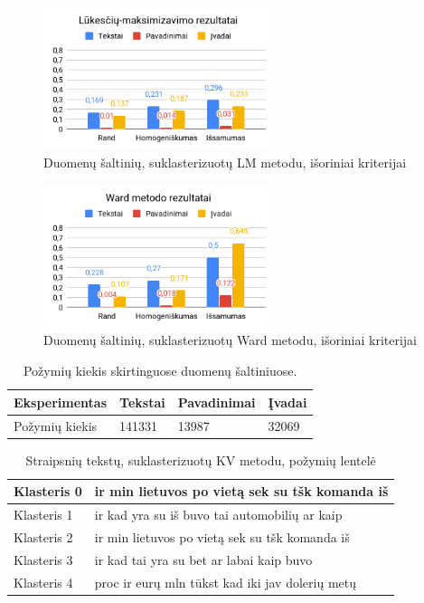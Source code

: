 \documentclass{VUMIFInfBakalaurinis}
\begin{document}
\begin{figure}[H]
	\centering
	\includegraphics[width=0.6\textwidth]{./img/image2.png}
  \caption{Duomenų šaltinių, suklasterizuotų LM metodu, išoriniai kriterijai}
\end{figure}

\begin{figure}[H]
	\centering
	\includegraphics[width=0.6\textwidth]{./img/image10.png}
  \caption{Duomenų šaltinių, suklasterizuotų Ward metodu, išoriniai kriterijai}
\end{figure}

\begin{table}[H]
  \centering
  \caption{Požymių kiekis skirtinguose duomenų šaltiniuose.}
  \begin{tabular}{|l|l|l|l|}
  \hline
  Eksperimentas & Tekstai & Pavadinimai & Įvadai \\ \hline
  Požymių kiekis        & 141331  & 13987       & 32069  \\ \hline
  \end{tabular}
\end{table}

\begin{table}[H]
  \centering
  \caption{Straipsnių tekstų, suklasterizuotų KV metodu, požymių lentelė}
  \small
  \begin{tabular}{|l|l|}
  \hline
  Klasteris 0 & ir min lietuvos po vietą sek su tšk komanda iš  \\ \hline
  Klasteris 1 & ir kad yra su iš buvo tai automobilių ar kaip   \\ \hline
  Klasteris 2 & ir min lietuvos po vietą sek su tšk komanda iš  \\ \hline
  Klasteris 3 & ir kad tai yra su bet ar labai kaip buvo        \\ \hline
  Klasteris 4 & proc ir eurų mln tūkst kad iki jav dolerių metų \\ \hline
  \end{tabular}
  \normalsize
\end{table}
\end{document}
